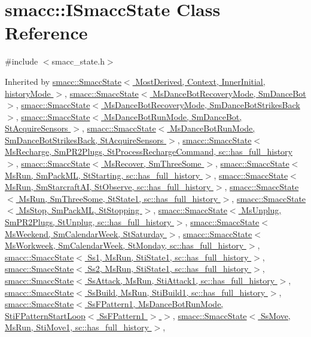 \hypertarget{classsmacc_1_1ISmaccState}{}\section{smacc\+:\+:I\+Smacc\+State Class Reference}
\label{classsmacc_1_1ISmaccState}


{\ttfamily \#include $<$smacc\+\_\+state.\+h$>$}



Inherited by \hyperlink{classsmacc_1_1SmaccState}{smacc\+::\+Smacc\+State$<$ Most\+Derived, Context, Inner\+Initial, history\+Mode $>$}, \hyperlink{classsmacc_1_1SmaccState}{smacc\+::\+Smacc\+State$<$ Ms\+Dance\+Bot\+Recovery\+Mode, Sm\+Dance\+Bot $>$}, \hyperlink{classsmacc_1_1SmaccState}{smacc\+::\+Smacc\+State$<$ Ms\+Dance\+Bot\+Recovery\+Mode, Sm\+Dance\+Bot\+Strikes\+Back $>$}, \hyperlink{classsmacc_1_1SmaccState}{smacc\+::\+Smacc\+State$<$ Ms\+Dance\+Bot\+Run\+Mode, Sm\+Dance\+Bot, St\+Acquire\+Sensors $>$}, \hyperlink{classsmacc_1_1SmaccState}{smacc\+::\+Smacc\+State$<$ Ms\+Dance\+Bot\+Run\+Mode, Sm\+Dance\+Bot\+Strikes\+Back, St\+Acquire\+Sensors $>$}, \hyperlink{classsmacc_1_1SmaccState}{smacc\+::\+Smacc\+State$<$ Ms\+Recharge, Sm\+P\+R2\+Plugs, St\+Process\+Recharge\+Command, sc\+::has\+\_\+full\+\_\+history $>$}, \hyperlink{classsmacc_1_1SmaccState}{smacc\+::\+Smacc\+State$<$ Ms\+Recover, Sm\+Three\+Some $>$}, \hyperlink{classsmacc_1_1SmaccState}{smacc\+::\+Smacc\+State$<$ Ms\+Run, Sm\+Pack\+M\+L, St\+Starting, sc\+::has\+\_\+full\+\_\+history $>$}, \hyperlink{classsmacc_1_1SmaccState}{smacc\+::\+Smacc\+State$<$ Ms\+Run, Sm\+Starcraft\+A\+I, St\+Observe, sc\+::has\+\_\+full\+\_\+history $>$}, \hyperlink{classsmacc_1_1SmaccState}{smacc\+::\+Smacc\+State$<$ Ms\+Run, Sm\+Three\+Some, St\+State1, sc\+::has\+\_\+full\+\_\+history $>$}, \hyperlink{classsmacc_1_1SmaccState}{smacc\+::\+Smacc\+State$<$ Ms\+Stop, Sm\+Pack\+M\+L, St\+Stopping $>$}, \hyperlink{classsmacc_1_1SmaccState}{smacc\+::\+Smacc\+State$<$ Ms\+Unplug, Sm\+P\+R2\+Plugs, St\+Unplug, sc\+::has\+\_\+full\+\_\+history $>$}, \hyperlink{classsmacc_1_1SmaccState}{smacc\+::\+Smacc\+State$<$ Ms\+Weekend, Sm\+Calendar\+Week, St\+Saturday $>$}, \hyperlink{classsmacc_1_1SmaccState}{smacc\+::\+Smacc\+State$<$ Ms\+Workweek, Sm\+Calendar\+Week, St\+Monday, sc\+::has\+\_\+full\+\_\+history $>$}, \hyperlink{classsmacc_1_1SmaccState}{smacc\+::\+Smacc\+State$<$ Ss1, Ms\+Run, Sti\+State1, sc\+::has\+\_\+full\+\_\+history $>$}, \hyperlink{classsmacc_1_1SmaccState}{smacc\+::\+Smacc\+State$<$ Ss2, Ms\+Run, Sti\+State1, sc\+::has\+\_\+full\+\_\+history $>$}, \hyperlink{classsmacc_1_1SmaccState}{smacc\+::\+Smacc\+State$<$ Ss\+Attack, Ms\+Run, Sti\+Attack1, sc\+::has\+\_\+full\+\_\+history $>$}, \hyperlink{classsmacc_1_1SmaccState}{smacc\+::\+Smacc\+State$<$ Ss\+Build, Ms\+Run, Sti\+Build1, sc\+::has\+\_\+full\+\_\+history $>$}, \hyperlink{classsmacc_1_1SmaccState}{smacc\+::\+Smacc\+State$<$ Ss\+F\+Pattern1, Ms\+Dance\+Bot\+Run\+Mode, Sti\+F\+Pattern\+Start\+Loop$<$ Ss\+F\+Pattern1 $>$ $>$}, \hyperlink{classsmacc_1_1SmaccState}{smacc\+::\+Smacc\+State$<$ Ss\+Move, Ms\+Run, Sti\+Move1, sc\+::has\+\_\+full\+\_\+history $>$}, 